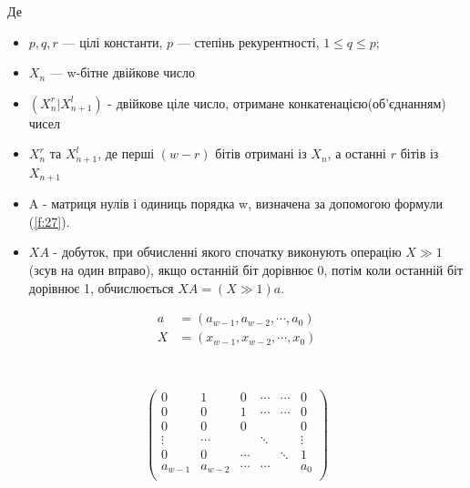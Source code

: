 \documentclass[oneside,final,14pt]{extreport}
\begin{document}
\begin{large}
Де
\begin{itemize}
	\item
\(p, q, r\) --- цілі константи, \(p\) --- степінь рекурентності, \(1 \leq q \leq p\);
	\item
$X_n$ --- w-бітне двійкове число
	\item 
$(X_{n}^r | X_{n+1}^l)$ - двійкове ціле число, отримане конкатенацією(об'єднанням) чисел 
	\item
$X_n^r$ та $X_{n+1}^l$, де перші $(w-r)$ бітів отримані із $X_n$, а останні $r$ бітів із $X_{n+1}$
	\item
A - матриця нулів і одиниць порядка w, визначена за допомогою формули (\ref{f:27}).
	\item
$XA$ - добуток, при обчисленні якого спочатку виконують операцію $X \gg 1$(зсув на один вправо), 
якщо останній біт дорівнює 0, потім коли останній біт дорівнює 1, обчислюється $XA = (X \gg 1)a$.
\end{itemize}
\begin{equation}
	\begin{split}
	a &= (a_{w-1}, a_{w-2}, \cdots, a_0) \\
	X &= (x_{w-1}, x_{w-2}, \cdots, x_0) \\
	\label{f:27}
	\end{split}
\end{equation}
\\\\
\[
	\left(
		\begin{matrix}
			0 & 1 & 0 & \cdots & \cdots & 0 \\
			0 & 0 & 1 & \cdots & \cdots & 0 \\
			0 & 0 & 0 &  &  & 0 \\
			\vdots & \cdots &  & \ddots &  & \vdots \\
			0 & 0 & \cdots &  & \ddots & 1 \\
			a_{w-1} & a_{w-2} & \cdots & \cdots &  & a_0 \\
		\end{matrix}
	\right)
\]
\\


\end{large}
\end{document}

